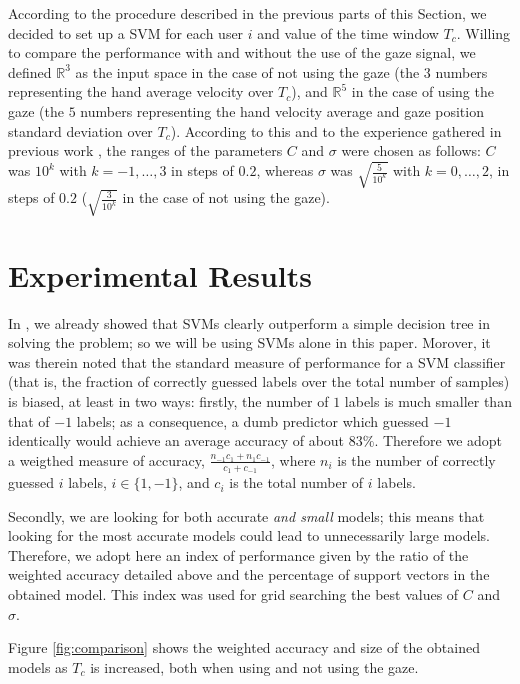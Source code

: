 \documentclass[jou,a4paper,notxfonts]{apa}
\def\RR{\mathbb{R}}
\begin{document}
According to the procedure described in the previous parts of this
Section, we decided to set up a SVM for each user $i$ and value of the
time window $T_c$. Willing to compare the performance with and without
the use of the gaze signal, we defined $\RR^{3}$ as the input space in
the case of not using the gaze (the $3$ numbers representing the hand
average velocity over $T_c$), and $\RR^{5}$ in the case of using the
gaze (the $5$ numbers representing the hand velocity average and gaze
position standard deviation over $T_c$). According to this and to the
experience gathered in previous work \cite{clea07}, the ranges of the
parameters $C$ and $\sigma$ were chosen as follows: $C$ was $10^k$
with $k=-1,\ldots,3$ in steps of $0.2$, whereas $\sigma$ was
$\sqrt{\frac{5}{10^{k}}}$ with $k=0,\ldots,2$, in steps of $0.2$
($\sqrt{\frac{3}{10^{k}}}$ in the case of not using the gaze).

\section{Experimental Results}

\label{sec:res}

In \cite{clea07}, we already showed that SVMs clearly outperform a
simple decision tree in solving the problem; so we will be using SVMs
alone in this paper. Morover, it was therein noted that the standard
measure of performance for a SVM classifier (that is, the fraction of
correctly guessed labels over the total number of samples) is biased,
at least in two ways: firstly, the number of $1$ labels is much
smaller than that of $-1$ labels; as a consequence, a dumb predictor
which guessed $-1$ identically would achieve an average accuracy of
about $83\%$. Therefore we adopt a weigthed measure of accuracy,
$\frac{n_{-1} c_1 + n_1 c_{-1}}{c_1+c_{-1}}$, where $n_i$ is the
number of correctly guessed $i$ labels, $i \in \{1,-1\}$, and $c_i$ is
the total number of $i$ labels.

Secondly, we are looking for both accurate \emph{and small} models;
this means that looking for the most accurate models could lead to
unnecessarily large models. Therefore, we adopt here an index of
performance given by the ratio of the weighted accuracy detailed above
and the percentage of support vectors in the obtained model. This
index was used for grid searching the best values of $C$ and $\sigma$.

Figure \ref{fig:comparison} shows the weighted accuracy and size of
the obtained models as $T_c$ is increased, both when using and not
using the gaze.
\end{document}
